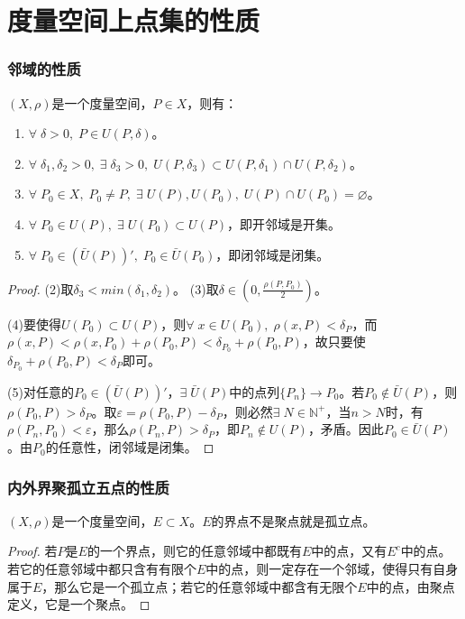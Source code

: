 \section{度量空间上点集的性质}
\subsubsection{邻域的性质}
\begin{property}
	$(X,\rho)$是一个度量空间，$P\in X$，则有：
	\begin{enumerate}
		\item $\forall\;\delta>0,\;P\in U(P,\delta)$。
		\item $\forall\;\delta_1,\delta_2>0,\;\exists\;\delta_3>0,\;U(P,\delta_3)\subset U(P,\delta_1)\cap U(P,\delta_2)$。
		\item $\forall\;P_0\in X,\;P_0\ne P,\;\exists\;U(P),U(P_0),\;U(P)\cap U(P_0)=\varnothing$。
		\item $\forall\;P_0\in U(P),\;\exists\;U(P_0)\subset U(P)$，即开邻域是开集。
		\item $\forall\;P_0\in\left(\bar{U}(P)\right)',\;P_0\in \bar{U}(P_0)$，即闭邻域是闭集。
	\end{enumerate}
\end{property}
\begin{proof}
	(2)取$\delta_3<min(\delta_1,\delta_2)$。
	(3)取$\delta\in(0,\frac{\rho(P,P_0)}{2})$。 \par
	(4)要使得$U(P_0)\subset U(P)$，则$\forall\;x\in U(P_0),\;\rho(x,P)<\delta_P$，而$\rho(x,P)<\rho(x,P_0)+\rho(P_0,P)<\delta_{P_0}+\rho(P_0,P)$，故只要使$\delta_{P_0}+\rho(P_0,P)<\delta_P$即可。 \par
	(5)对任意的$P_0\in\left(\bar{U}(P)\right)'$，$\exists\;\bar{U}(P)$中的点列$\{P_n\}\to P_0$。若$P_0\notin \bar{U}(P)$，则$\rho(P_0,P)>\delta_P$。取$\varepsilon=\rho(P_0,P)-\delta_P$，则必然$\exists\;N\in\mathbb{N}^+$，当$n>N$时，有$\rho(P_n,P_0)<\varepsilon$，那么$\rho(P_n,P)>\delta_P$，即$P_n\notin U(P)$，矛盾。因此$P_0\in \bar{U}(P)$。由$P_0$的任意性，闭邻域是闭集。
\end{proof}
\subsubsection{内外界聚孤立五点的性质}
\begin{theorem}
	$(X,\rho)$是一个度量空间，$E\subset X$。$E$的界点不是聚点就是孤立点。
\end{theorem}
\begin{proof}
	若$P$是$E$的一个界点，则它的任意邻域中都既有$E$中的点，又有$E^c$中的点。若它的任意邻域中都只含有有限个$E$中的点，则一定存在一个邻域，使得只有自身属于$E$，那么它是一个孤立点；若它的任意邻域中都含有无限个$E$中的点，由聚点定义，它是一个聚点。
\end{proof}
